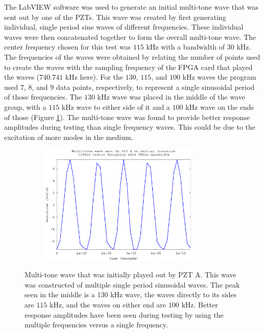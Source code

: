 \documentclass[11pt,letterpaper]{article}%
\begin{document}
The LabVIEW software was used to generate an initial multi-tone wave that was sent out by one of the PZTs. This wave was created by first generating individual, single period sine waves of different frequencies. These individual waves were then concatenated together to form the overall multi-tone wave. The center frequency chosen for this test was $115$ kHz with a bandwidth of $30$ kHz. The frequencies of the waves were obtained by relating the number of points used to create the waves with the sampling frequency of the FPGA card that played the waves ($740.741$ kHz here). For the $130$, $115$, and $100$ kHz waves the program used $7$, $8$, and $9$ data points, respectively, to represent a single sinusoidal period of those frequencies. The $130$ kHz wave was placed in the middle of the wave group, with a $115$ kHz wave to either side of it and a $100$ kHz wave on the ends of those (Figure \ref{initialWave}). The multi-tone wave was found to provide better response amplitudes during testing than single frequency waves. This could be due to the excitation of more modes in the medium.

\begin{figure}
\begin{center}
{\includegraphics[width=9.7cm,height=5.75cm]{initialWave.eps}}
 \caption[comp1]
   { \label{initialWave}
   Multi-tone wave that was initially played out by PZT A. This wave was constructed of multiple single period sinusoidal waves. The peak seen in the middle is a $130$ kHz wave, the waves directly to its sides are $115$ kHz, and the waves on either end are $100$ kHz. Better response amplitudes have been seen during testing by using the multiple frequencies versus a single frequency.
 }
 \end{center}
 \end{figure}
\end{document}
